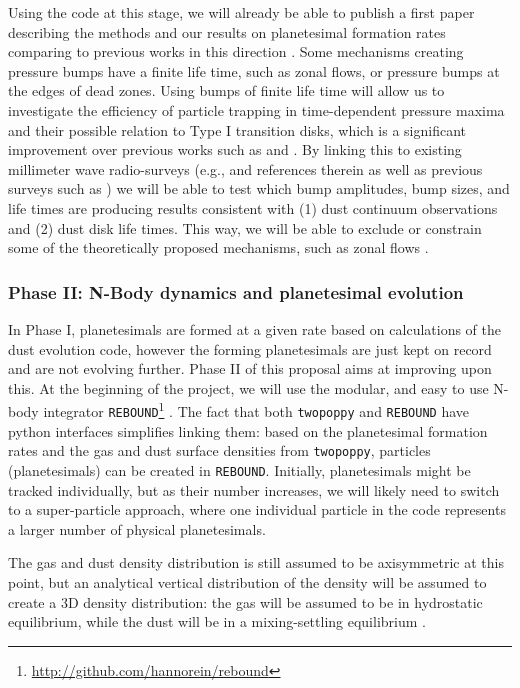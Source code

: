 \documentclass[10pt,fleqn,twoside]{article}
\newcommand{\twopoppy}{\texttt{twopoppy}\xspace}
\newcommand{\rebound}{\texttt{REBOUND}\xspace}
\begin{document}
Using the code at this stage, we will already be able to publish a
first paper describing the methods and our results on planetesimal
formation rates comparing to previous works in this direction
\citep[e.g.,][]{2014A&A...572A..78D, 2016A&A...586A..20K}. Some
mechanisms creating pressure bumps have a finite life time, such as
zonal flows, or pressure bumps at the edges of dead zones. Using bumps
of finite life time will allow us to investigate the efficiency of
particle trapping in time-dependent pressure maxima and their possible
relation to Type I transition disks, which is a significant
improvement over previous works such as \citet{2012A&A...538A.114P}
and \citet{2013A&A...554A..95P}. By linking this to existing
millimeter wave radio-surveys (e.g.,
\citealp{2016ApJ...831..125P} and references therein as well as
previous surveys such as \citealp{2010A&A...521A..66R}) we will be
able to test which bump amplitudes, bump sizes, and life times are
producing results consistent with (1) dust continuum observations and
(2) dust disk life times. This way, we will be able to exclude or
constrain some of the theoretically proposed mechanisms, such as zonal
flows \citep[e.g.,][]{2009ApJ...697.1269J, 2013ApJ...763..117D,
2014ApJ...796...31B}.

\subsubsection{Phase II: N-Body dynamics and planetesimal evolution}
\label{sec:phaseII}

In Phase I, planetesimals are formed at a given rate based on
calculations of the dust evolution code, however the forming
planetesimals are just kept on record and are not evolving further.
Phase II of this proposal aims at improving upon this. At the
beginning of the project, we will use the modular, and easy to use
N-body integrator
\rebound\footnote{\url{http://github.com/hannorein/rebound}}
\citep{2012A&A...537A.128R}. The fact that both \twopoppy and \rebound
have python interfaces simplifies linking them: based on the
planetesimal formation rates and the gas and dust surface densities
from \twopoppy, particles (planetesimals) can be created in \rebound.
Initially, planetesimals might be tracked individually, but as their
number increases, we will likely need to switch to a super-particle
approach, where one individual particle in the code represents a
larger number of physical planetesimals.

The gas and dust density distribution is still assumed to be
axisymmetric at this point, but an analytical vertical distribution of
the density will be assumed to create a 3D density distribution: the
gas will be assumed to be in hydrostatic equilibrium, while the dust
will be in a mixing-settling equilibrium \citep{2009A&A...496..597F}.
\end{document}
